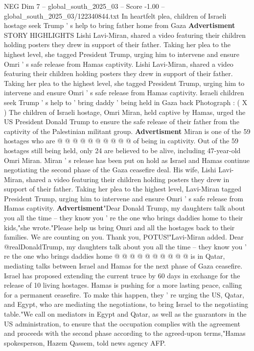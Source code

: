 \begin{textsample}{NEG Dim 7 – global\_south\_2025\_03 – Score -1.00 – global\_south\_2025\_03/122340844.txt}  \label{ex:f7_neg_023}
In heartfelt plea, children of Israeli hostage seek Trump ' s help to bring father home from Gaza \textbf{Advertisment} STORY HIGHLIGHTS Lishi Lavi-Miran, shared a video featuring their children holding posters they drew in support of their father.
Taking her plea to the highest level, she tagged President Trump, urging him to intervene and ensure Omri ' s safe release from Hamas captivity.
Lishi Lavi-Miran, shared a video featuring their children holding posters they drew in support of their father.
Taking her plea to the highest level, she tagged President Trump, urging him to intervene and ensure Omri ' s safe release from Hamas captivity.
Israeli children seek Trump ' s help to ' bring daddy ' being held in Gaza back Photograph : ( X ) The children of Israeli hostage, Omri Miran, held captive by Hamas, urged the US President Donald Trump to ensure the safe release of their father from the captivity of the Palestinian militant group. \textbf{Advertisment} Miran is one of the 59 hostages who are @ @ @ @ @ @ @ @ @ @ of being in captivity.
Out of the 59 hostages still being held, only 24 are believed to be alive, including 47-year-old Omri Miran.
Miran ' s release has been put on hold as Israel and Hamas continue negotiating the second phase of the Gaza ceasefire deal.
His wife, Lishi Lavi-Miran, shared a video featuring their children holding posters they drew in support of their father.
Taking her plea to the highest level, Lavi-Miran tagged President Trump, urging him to intervene and ensure Omri ' s safe release from Hamas captivity. \textbf{Advertisment}"Dear Donald Trump, my daughters talk about you all the time -- they know you ' re the one who brings daddies home to their kids,"she wrote."Please help us bring Omri and all the hostages back to their families.
We are counting on you.
Thank you, POTUS!"Lavi-Miran added.
Dear @realDonaldTrump, my daughters talk about you all the time -- they know you ' re the one who brings daddies home @ @ @ @ @ @ @ @ @ @ is in Qatar, mediating talks between Israel and Hamas for the next phase of Gaza ceasefire.
Israel has proposed extending the current truce by 60 days in exchange for the release of 10 living hostages.
Hamas is pushing for a more lasting peace, calling for a permanent ceasefire.
To make this happen, they ' re urging the US, Qatar, and Egypt, who are mediating the negotiations, to bring Israel to the negotiating table."We call on mediators in Egypt and Qatar, as well as the guarantors in the US administration, to ensure that the occupation complies with the agreement and proceeds with the second phase according to the agreed-upon terms,"Hamas spokesperson, Hazem Qassem, told news agency AFP.

\end{textsample}
